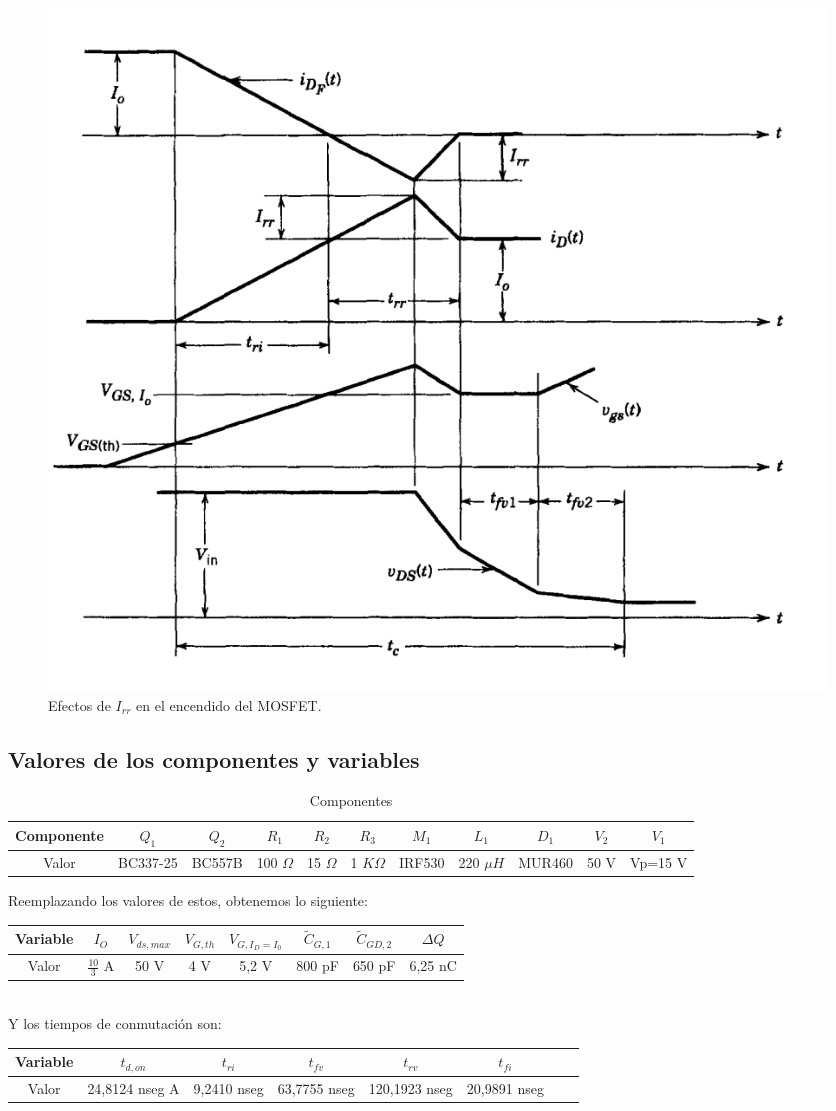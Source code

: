 \documentclass[e4_tp1_main.tex]{subfiles}
\begin{document}
\begin{figure}[H]
  \centering
  \includegraphics[width=\linewidth/2]{images/ej1/diode_irr.png}
  \caption{Efectos de $I_{rr}$ en el encendido del MOSFET.}
  \label{fig:diode}
\end{figure}

\subsection{Valores de los componentes y variables}
\begin{table}[H]
\begin{tabular}{|c|c|c|c|c|c|c|c|c|c|c|}
\hline
Componente & $Q_1$ & $Q_2$ & $R_1$ & $R_2$ & $R_3$ & $M_1$ & $L_1$ & $D_1$ & $V_2$ & $V_1$\\
\hline
Valor & BC337-25 & BC557B & 100 $\Omega$ & 15 $\Omega$ & 1 $K\Omega$ & IRF530 & 220 $\mu H$ & MUR460 & 50 V & Vp=15 V\\
\hline
\end{tabular}
\caption{Componentes}
\end{table}
Reemplazando los valores de estos, obtenemos lo siguiente:\\
\begin{tabular}{|c|c|c|c|c|c|c|c|}
\hline
Variable & $I_O$ & $V_{ds,max}$ & $V_{G,th}$ & $V_{G,I_D=I_0}$ & $\tilde{C}_{G,1}$ & $\tilde{C}_{GD,2}$ & $\Delta Q$  \\
\hline
Valor & $\frac{10}{3}$ A & 50 V & 4 V & 5,2 V & 800 pF & 650 pF & 6,25 nC\\
\hline
\end{tabular}\\
Y los tiempos de conmutación son:\\
\begin{tabular}{|c|c|c|c|c|c|c|c|}
\hline
Variable & $t_{d,on}$ & $t_{ri}$ & $t_{fv}$ & $t_{rv}$ & $t_{fi}$  \\
\hline
Valor & 24,8124 nseg A & 9,2410 nseg & 63,7755 nseg & 120,1923 nseg & 20,9891 nseg\\
\hline
\end{tabular}
\end{document}
